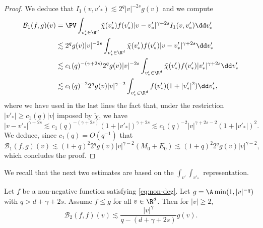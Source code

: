 \begin{proof}
We deduce that $I_1(v,v'_*) \lesssim 2^q |v|^{-2s}g(v)$ and we compute
\begin{align*}
\mathcal{B}_1(f,g)(v) & = \PV \int_{v'_* \in \R^d} \tilde \chi(v'_*) f(v'_*) |v-v'_*|^{\gamma+2s} I_1(v,v'_*) \dd v'_* \\
& \lesssim 2^q g(v) |v|^{-2s} \int_{v'_* \in
\R^d} \tilde \chi(v'_*) f(v'_*)
|v-v'_*|^{\gamma+2s} \dd v'_* \\
& \lesssim c_1(q)^{-(\gamma+2s)} 2^q g(v) |v|^{-2s} \int_{v'_* \in
\R^d} \tilde \chi(v'_*) f(v'_*) |v'_*|^{\gamma+2s} \dd v'_* \\
& \lesssim c_1(q)^{-2} 2^q g(v) |v|^{\gamma-2} \int_{v'_* \in \R^d} f(v'_*) (1+|v'_*|^2) \dd v'_*,
\end{align*}
where we have used in the last lines the fact that, under the
restriction $|v'_*| \ge c_1(q) |v|$ imposed by $\tilde \chi$, we have
\[
|v-v'_*|^{\gamma+2s} \lesssim c_1(q)^{-(\gamma+2s)} (1+|v'_*|)^{\gamma+2s}
\lesssim c_1(q)^{-2} |v|^{\gamma+2s-2} (1+|v'_*|)^{2}.
\]
We deduce, since $c_1(q) = O(q^{-1})$ that
\begin{equation*}
\mathcal{B}_1(f,g)(v) \lesssim (1+q)^2 2^q g(v) |v|^{\gamma-2} (M_0 + E_0)
\lesssim (1+q)^2 2^q g(v) |v|^{\gamma-2},
\end{equation*}
which concludes the proof.
\end{proof}

We recall that the next two estimates are based on the $\int_{v'}
\int_{v'_*}$ representation.

\begin{prop} \label{prop:B2} Let $f$ be a non-negative function satisfying \eqref{eq:non-deg}. Let
$g = \A \min(1,|v|^{-q})$ with $q> d+ \gamma +2s$. Assume $f \leq g$ for all $v \in \R^d$. Then for
$|v| \ge 2$,
\[ \mathcal{B}_2 (f,f)(v)
\lesssim \frac{|v|^{\gamma}}{q-(d+\gamma + 2s)} g(v).\]
\end{prop}

